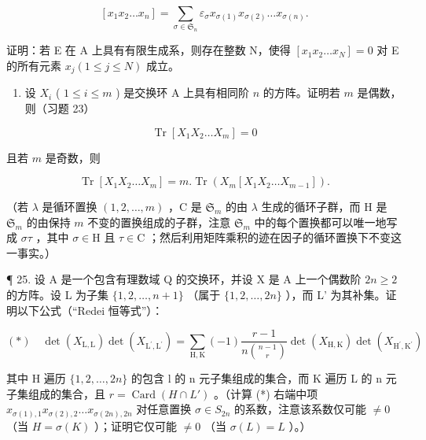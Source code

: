 \[
\left[ x _ {1} x _ {2} \dots x _ {n} \right] = \sum_ {\sigma \in \mathfrak {S} _ {n}} \varepsilon_ {\sigma} x _ {\sigma (1)} x _ {\sigma (2)} \dots x _ {\sigma (n)}.
\]

证明：若 E 在 A 上具有有限生成系，则存在整数 N，使得 \([x_{1}x_{2}\ldots x_{N}] = 0\) 对 E 的所有元素 \(x_{j} (1 \leqslant j \leqslant N)\) 成立。

\begin{enumerate}
\def\labelenumi{\arabic{enumi}.}
\setcounter{enumi}{23}
\tightlist
\item
  设 \(X_{i}\) ( \(1 \leqslant i \leqslant m\) ) 是交换环 A 上具有相同阶 \(n\) 的方阵。证明若 \(m\) 是偶数，则（习题 23）
\end{enumerate}

\[
\operatorname{Tr} \left[ X _ {1} X _ {2} \dots X _ {m} \right] = 0
\]

且若 \(m\) 是奇数，则

\[
\operatorname{Tr} \left[ X _ {1} X _ {2} \dots X _ {m} \right] = m. \operatorname{Tr} \left(X _ {m} \left[ X _ {1} X _ {2} \dots X _ {m - 1} \right]\right).
\]

（若 \(\lambda\) 是循环置换 \((1,2,\ldots,m)\) ，C 是 \(\mathfrak{S}_m\) 的由 \(\lambda\) 生成的循环子群，而 H 是 \(\mathfrak{S}_m\) 的由保持 \(m\) 不变的置换组成的子群，注意 \(\mathfrak{S}_m\) 中的每个置换都可以唯一地写成 \(\sigma\tau\) ，其中 \(\sigma\in\mathrm{H}\) 且 \(\tau\in\mathrm{C}\) ；然后利用矩阵乘积的迹在因子的循环置换下不变这一事实。）

¶ 25. 设 A 是一个包含有理数域 Q 的交换环，并设 X 是 A 上一个偶数阶 \(2n \geqslant 2\) 的方阵。设 L 为子集 \(\{1, 2, \ldots, n + 1\}\) （属于 \(\{1, 2, \ldots, 2n\}\) ），而 L' 为其补集。证明以下公式（“Redei 恒等式”）：

\[
(*) \quad \det (X _ {\mathrm{L}, \mathrm{L}}) \det (X _ {\mathrm{L} ^ {\prime}, \mathrm{L} ^ {\prime}}) = \sum_ {\mathrm{H}, \mathrm{K}} (- 1) \frac {r - 1}{n \binom {n - 1} {r}} \det (X _ {\mathrm{H}, \mathrm{K}}) \det (X _ {\mathrm{H} ^ {\prime}, \mathrm{K} ^ {\prime}})
\]

其中 H 遍历 \(\{1,2,\ldots,2n\}\) 的包含 l 的 n 元子集组成的集合，而 K 遍历 L 的 n 元子集组成的集合，且 \(r=\operatorname{Card}(H\cap L')\) 。（计算 (*) 右端中项 \(x_{\sigma(1),1}x_{\sigma(2),2}\ldots x_{\sigma(2n),2n}\) 对任意置换 \(\sigma\in S_{2n}\) 的系数，注意该系数仅可能 \(\neq0\) （当 \(H=\sigma(K)\) ）；证明它仅可能 \(\neq0\) （当 \(\sigma(L)=L\) ）。）

